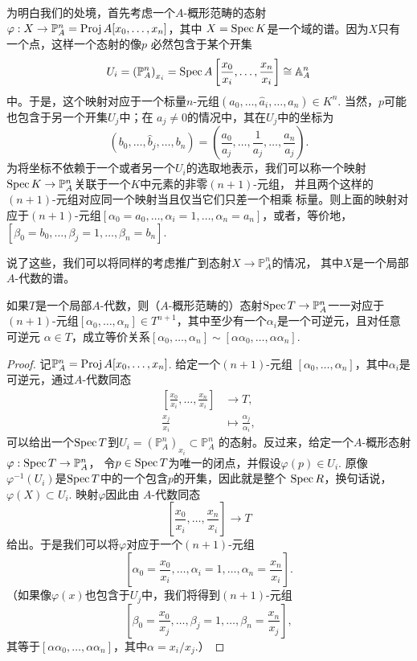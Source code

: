 为明白我们的处境，首先考虑一个$A$-概形范畴的态射
$\varphi:X\to \mathbb P^n_A=\operatorname{Proj} A[x_0,\dots,x_n]$，其中
$X=\operatorname{Spec} K$是一个域的谱。因为$X$只有一个点，这样一个态射的像$p$
必然包含于某个开集
\[
	U_i=\left(\mathbb P_A^n\right)_{x_i}=\operatorname{Spec} A\left[
	\frac{x_0}{x_i},\dots,\frac{x_n}{x_i}\right]\cong \mathbb A_A^n
\]
中。于是，这个映射对应于一个标量$n$-元组$(a_0,\dots,\hat a_i,
\dots,a_n)\in K^n$. 当然，$p$可能也包含于另一个开集$U_j$中；在
$a_j\neq 0$的情况中，其在$U_j$中的坐标为
\[
	(b_0,\dots,\hat b_j,\dots,b_n)=\left(
	\frac{a_0}{a_j},\dots,\frac{1}{a_j},\dots,\frac{a_n}{a_j}
	\right).
\]
为将坐标不依赖于一个或者另一个$U_i$的选取地表示，我们可以称一个映射
$\operatorname{Spec} K\to \mathbb P_A^n$关联于一个$K$中元素的非零$(n+1)$-元组，
并且两个这样的$(n+1)$-元组对应同一个映射当且仅当它们只差一个相乘
标量。则上面的映射对应于$(n+1)$-元组$[\alpha_0=a_0,\dots,\alpha_i
=1,\dots,\alpha_n=a_n]$，或者，等价地，$[\beta_0=b_0,\dots,
\beta_j=1,\dots,\beta_n=b_n]$.

说了这些，我们可以将同样的考虑推广到态射$X\to \mathbb P^n_A$的情况，
其中$X$是一个局部$A$-代数的谱。

\begin{pro}\label{pro:3.36}
如果$T$是一个局部$A$-代数，则（$A$-概形范畴的）态射$\operatorname{Spec} T\to 
\mathbb P_A^n$一一对应于$(n+1)$-元组$[\alpha_0,\dots,\alpha_n]
\in T^{n+1}$，其中至少有一个$\alpha_i$是一个可逆元，且对任意可逆元
$\alpha\in T$，成立等价关系$[\alpha_0,\dots,\alpha_n]\sim 
[\alpha\alpha_0,\dots,\alpha\alpha_n]$.
\end{pro}

\begin{proof}
记$\mathbb P_A^n=\operatorname{Proj} A[x_0,\dots,x_n]$. 给定一个$(n+1)$-元组
$[\alpha_0,\dots,\alpha_n]$，其中$\alpha_i$是可逆元，通过$A$-代数同态
\begin{align*}
\left[\frac{x_0}{x_i},\dots,\frac{x_n}{x_i}\right]&\longrightarrow T,\\
\frac{x_j}{x_i}&\longmapsto \frac{\alpha_j}{\alpha_i},
\end{align*}
可以给出一个$\operatorname{Spec} T$到$U_i=(\mathbb P_A^n)_{x_i}\subset \mathbb P_A^n$
的态射。反过来，给定一个$A$-概形态射$\varphi:\operatorname{Spec} T\to \mathbb P_A^n$，
令$p\in \operatorname{Spec} T$为唯一的闭点，并假设$\varphi(p)\in U_i$. 原像
$\varphi^{-1}(U_i)$是$\operatorname{Spec} T$中的一个包含$p$的开集，因此就是整个
$\operatorname{Spec} R$，换句话说，$\varphi(X)\subset U_i$. 映射$\varphi$因此由
$A$-代数同态
\[
	\left[\frac{x_0}{x_i},\dots,\frac{x_n}{x_i}\right]\longrightarrow T
\]
给出。于是我们可以将$\varphi$对应于一个$(n+1)$-元组
\[
	\left[\alpha_0=\frac{x_0}{x_i},\dots,\alpha_i=1,\dots,
	\alpha_n=\frac{x_n}{x_i}\right].
\]
（如果像$\varphi(x)$也包含于$U_j$中，我们将得到$(n+1)$-元组
\[
	\left[\beta_0=\frac{x_0}{x_j},\dots,\beta_j=1,\dots,
	\beta_n=\frac{x_n}{x_j}\right],
\]
其等于$[\alpha \alpha_0,\dots,\alpha\alpha_n]$，其中$\alpha=x_i/x_j$.）
\end{proof}

